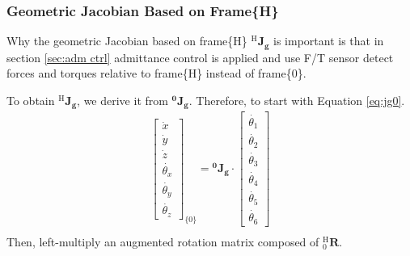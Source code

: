 \subsubsection{Geometric Jacobian Based on Frame\{H\}}
\label{sec:jg6}
\hspace*{6mm}Why the geometric Jacobian based on frame\{H\} $^{\mathrm{H}}\!\mathbf{J_g}$ is important is that in section \ref{sec:adm ctrl} admittance control is applied and use F/T sensor detect forces and torques relative to frame\{H\} instead of frame\{0\}. 
\par
To obtain $^{\mathrm{H}}\!\mathbf{J_g}$, we derive it from $\mathbf{^0\!J_g}$. Therefore, to start with Equation \ref{eq:jg0}.
\begin{equation}
\begin{split}
\begin{bmatrix}
\dot{x}\\
\dot{y}\\
\dot{z}\\
\dot{\theta _x}\\
\dot{\theta _y}\\
\dot{\theta _z}
\end{bmatrix}_{\!\{0\}}
=
\mathbf{^0\!J_g} \cdot 
\begin{bmatrix}
\dot{\theta _1} \\ 
\dot{\theta _2} \\ 
\dot{\theta _3} \\ 
\dot{\theta _4} \\ 
\dot{\theta _5} \\ 
\dot{\theta _6} 
\end{bmatrix}\\
\end{split}
\end{equation}
Then, left-multiply an augmented rotation matrix composed of $^{\mathrm{H}}_0\mathbf{R}$.
